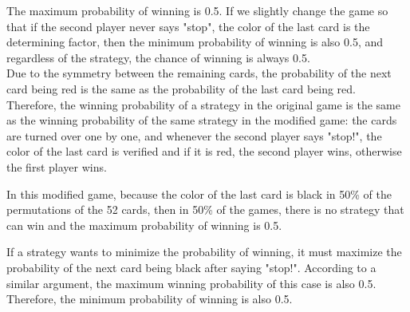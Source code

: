 \begin{solution}
	The maximum probability of winning is 0.5. If we slightly change the game so that if the second player never says "stop", the color of the last card is the determining factor, then the minimum probability of winning is also 0.5, and regardless of the strategy, the chance of winning is always 0.5.\\[0.2cm]
	
	Due to the symmetry between the remaining cards, the probability of the next card being red is the same as the probability of the last card being red. Therefore, the winning probability of a strategy in the original game is the same as the winning probability of  the same strategy in the modified game: the cards are turned over one by one, and whenever the second player says "stop!", the color of the last card is verified and if it is red, the second player wins, otherwise the first player  wins.
	
	In this modified game, because the color of the last card is black in 50\% of the permutations of the 52 cards, then in 50\% of the games, there is no strategy that can win and the maximum probability of winning is 0.5.
	
	If a strategy wants to minimize the probability of winning, it must maximize the probability of the next card being black after saying "stop!". According to a similar argument, the maximum winning probability of this case is also 0.5. Therefore, the minimum probability of winning is also 0.5.
	
\end{solution}